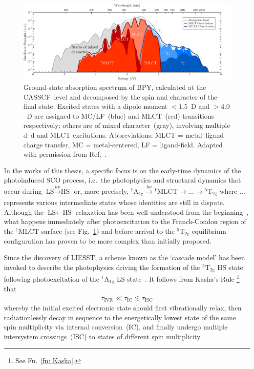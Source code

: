 \begin{figure}[ht!]
  \centering
  \includegraphics[width = \textwidth]{Figures/fig_SCO_MLCT.pdf}
  \caption[Calculated ground-state absorption spectrum of BPY.]{
    Ground-state absorption spectrum of BPY,
    calculated at the CASSCF~level and decomposed by the spin and character
    of the final state. Excited states with a dipole moment $< 1.5$~D
    and $> 4.0$~D are assigned to MC/LF~(blue) and MLCT~(red) transitions respectively;
    others are of mixed character~(gray), involving multiple d--d and MLCT excitations.
    Abbreviations: MLCT = metal--ligand charge transfer,
    MC = metal-centered, LF = ligand-field.
    Adapted with permission from Ref.~\cite{Domingo2014}.
  }
  \label{fig: SCO-MLCT}
\end{figure}

In the works of this thesis, a specific focus is on
the early-time dynamics of the photoinduced SCO process,
i.e.~the photophysics and structural dynamics
that occur during $\text{LS} \xrightarrow[]{h \nu} \text{HS}$
or, more precisely,
$\mathrm{^1A_{1g}} \xrightarrow[]{h \nu} \mathrm{^1MLCT} \rightarrow \ldots \rightarrow \mathrm{^5T_{2g}}$
where $\ldots$ represents various intermediate states whose identities are still in dispute.
%
Although the $\text{LS} \leftarrow \text{HS}$ relaxation has been
well-understood from the beginning~\cite{Buhks1980, Xie1987, Hauser1991c},
what happens immediately after photoexcitation to the Franck-Condon region
of the $\mathrm{^1MLCT}$ surface (see Fig.~\ref{fig: SCO-MLCT}) and before arrival
to the $\mathrm{^5T_{2g}}$ equilibrium configuration
has proven to be more complex than initially proposed.

Since the discovery of LIESST, a scheme known as the `cascade model'
has been invoked to describe the photophysics driving
the formation of the $\mathrm{^5T_{2g}}$ HS state following photoexcitation of
the $\mathrm{^1A_{1g}}$ LS state~\cite{Hauser1991c}.
%
It follows from Kasha's Rule%
\footnote{See Fn.~\ref{fn: Kasha}.} that
%
\begin{equation}
  \begin{aligned}
    \tau_\text{IVR} \ll \tau_\text{IC} \lesssim \tau_\text{ISC}
  \end{aligned}
\end{equation}
%
whereby the initial excited electronic state should first vibrationally relax,
then radiationlessly decay in sequence to the energetically lowest state of the same spin multiplicity
via internal conversion~(IC), and finally undergo multiple intersystem crossings~(ISC)
to states of different spin multiplicity~\cite{Chergui2015}.

